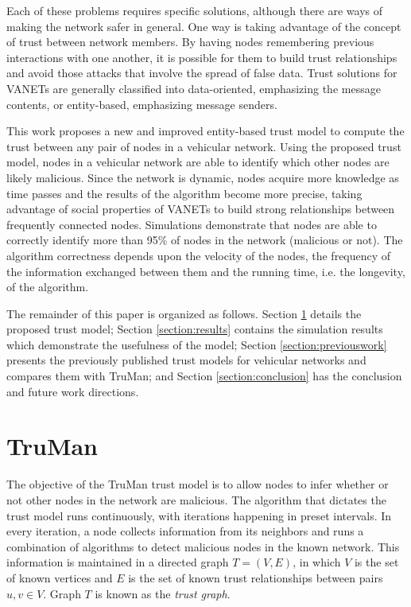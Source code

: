 \documentclass[conference]{IEEEtran}
\begin{document}
Each of these problems requires specific solutions, although there are ways of making the network safer in general.
One way is taking advantage of the concept of trust between network members.
By having nodes remembering previous interactions with one another, it is possible for them to build trust relationships and avoid those attacks that involve the spread of false data.
Trust solutions for VANETs are generally classified into data-oriented, emphasizing the message contents, or entity-based, emphasizing message senders.

This work proposes a new and improved entity-based trust model to compute the trust between any pair of nodes in a vehicular network.
Using the proposed trust model, nodes in a vehicular network are able to identify which other nodes are likely malicious.
Since the network is dynamic, nodes acquire more knowledge as time passes and the results of the algorithm become more precise, taking advantage of social properties of VANETs \cite{da2013effective} \cite{cunha2014possible} to build strong relationships between frequently connected nodes.
Simulations demonstrate that nodes are able to correctly identify more than 95\% of nodes in the network (malicious or not).
The algorithm correctness depends upon the velocity of the nodes, the frequency of the information exchanged between them and the running time, i.e. the longevity, of the algorithm.


The remainder of this paper is organized as follows.
Section \ref{section:algorithm} details the proposed trust model;
Section \ref{section:results} contains the simulation results which demonstrate the usefulness of the model;
Section \ref{section:previouswork} presents the previously published trust models for vehicular networks and compares them with TruMan;
and Section \ref{section:conclusion} has the conclusion and future work directions.

\section{TruMan}
\label{section:algorithm}


The objective of the TruMan trust model is to allow nodes to infer whether or not other nodes in the network are malicious.
The algorithm that dictates the trust model runs continuously, with iterations happening in preset intervals.
In every iteration, a node collects information from its neighbors and runs a combination of algorithms to detect malicious nodes in the known network.
This information is maintained in a directed graph $T=(V,E)$, in which $V$ is the set of known vertices and $E$ is the set of known trust relationships between pairs $u,v \in V$.
Graph $T$ is known as the \textit{trust graph}.
\end{document}
